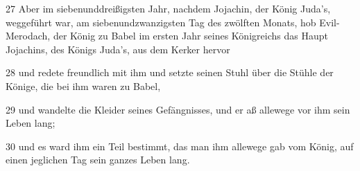 \par 27 Aber im siebenunddreißigsten Jahr, nachdem Jojachin, der König Juda's, weggeführt war, am siebenundzwanzigsten Tag des zwölften Monats, hob Evil-Merodach, der König zu Babel im ersten Jahr seines Königreichs das Haupt Jojachins, des Königs Juda's, aus dem Kerker hervor
\par 28 und redete freundlich mit ihm und setzte seinen Stuhl über die Stühle der Könige, die bei ihm waren zu Babel,
\par 29 und wandelte die Kleider seines Gefängnisses, und er aß allewege vor ihm sein Leben lang;
\par 30 und es ward ihm ein Teil bestimmt, das man ihm allewege gab vom König, auf einen jeglichen Tag sein ganzes Leben lang.


